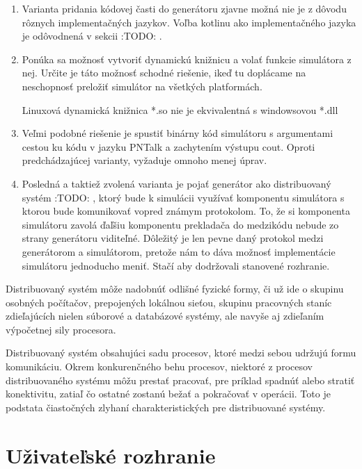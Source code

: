 \begin{enumerate}
	\item Varianta pridania kódovej časti do generátoru zjavne možná nie je z dôvodu rôznych implementačných jazykov. Voľba kotlinu ako implementačného jazyka je odôvodnená v sekcii :TODO: .
	
	\item Ponúka sa možnosť vytvoriť dynamickú knižnicu a volať funkcie simulátora z nej. Určite je táto možnosť schodné riešenie, ikeď tu doplácame na neschopnosť preložiť simulátor na všetkých platformách.
	
	\begin{note}
		Linuxová dynamická knižnica *.so nie je ekvivalentná s windowsovou *.dll
	\end{note}
	
	\item Veľmi podobné riešenie je spustiť binárny kód simulátoru s argumentami cestou ku kódu v jazyku PNTalk a zachytením výstupu cout. Oproti predchádzajúcej varianty, vyžaduje omnoho menej úprav.
	
	\item Posledná a taktiež zvolená varianta je pojať generátor ako distribuovaný systém :TODO: , ktorý bude k simulácii využívať komponentu simulátora s ktorou bude komunikovať vopred známym protokolom. To, že si komponenta simulátoru zavolá ďaľšiu komponentu prekladača do medzikódu nebude zo strany generátoru viditeľné. Dôležitý je len pevne daný protokol medzi generátorom a simulátorom, pretože nám to dáva možnosť implementácie simulátoru jednoducho meniť. Stačí aby dodržovali stanovené rozhranie.
	
\end{enumerate}

Distribuovaný systém môže nadobnúť odlišné fyzické formy, či už ide o skupinu osobných počítačov, prepojených lokálnou sieťou, skupinu pracovných staníc zdieľajúcích nielen súborové a databázové systémy, ale navyše aj zdieľaním výpočetnej sily procesora.\cite{}

Distribuovaný systém obsahujúci sadu procesov, ktoré medzi sebou udržujú formu komunikáciu. Okrem konkurenčného behu procesov, niektoré z procesov distribuovaného systému môžu prestať pracovať, pre príklad spadnúť alebo stratiť konektivitu, zatiaľ čo ostatné zostanú bežať a pokračovať v operácii. Toto je podstata čiastočných zlyhaní charakteristických pre distribuované systémy.
\cite{ovilex_ds2016}

\section{Uživateľské rozhranie}

